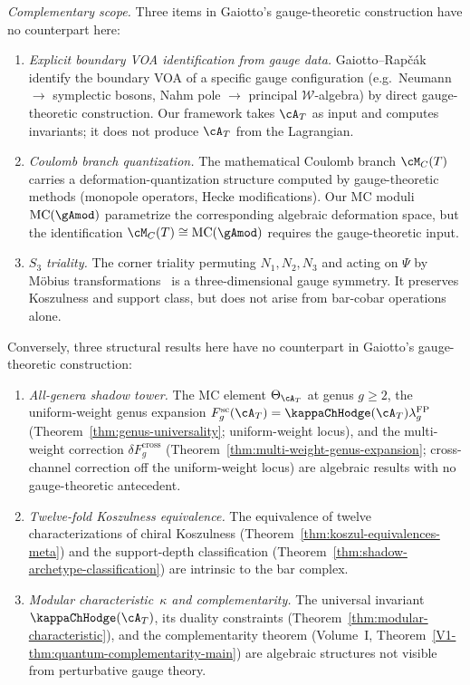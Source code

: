 \begin{remark}
\emph{Complementary scope.}
Three items in Gaiotto's gauge-theoretic construction have no
counterpart here:
\begin{enumerate}[label=\textup{(\alph*)}]
\item \emph{Explicit boundary VOA identification from gauge data.}
 Gaiotto--Rap\v{c}\'ak~\cite{gaiotto-rapchak} identify the
 boundary VOA of a specific gauge configuration (e.g.\
 Neumann $\to$ symplectic bosons,
 Nahm pole $\to$ principal $\mathcal{W}$-algebra) by
 direct gauge-theoretic construction. Our framework takes
 $\cA_T$ as input and computes invariants; it does not
 produce $\cA_T$ from the Lagrangian.

\item \emph{Coulomb branch quantization.}
 The mathematical Coulomb branch
 $\cM_C(T)$~\cite{BFN18} carries a
 deformation-quantization structure computed by gauge-theoretic
 methods (monopole operators, Hecke modifications). Our MC
 moduli $\operatorname{MC}(\gAmod)$ parametrize the
 corresponding algebraic deformation space, but the
 identification $\cM_C(T) \cong \operatorname{MC}(\gAmod)$
 requires the gauge-theoretic input.

\item \emph{$S_3$ triality.}
 The corner triality permuting $N_1, N_2, N_3$ and acting on
 $\Psi$ by M\"obius
 transformations~\cite{gaiotto-rapchak}
 is a three-dimensional gauge symmetry. It preserves
 Koszulness and support class, but does not arise from bar-cobar
 operations alone.
\end{enumerate}
Conversely, three structural results here have no counterpart
in Gaiotto's gauge-theoretic construction:
\begin{enumerate}[label=\textup{(\alph*)}]
\item \emph{All-genera shadow tower.}
 The MC element $\Theta_{\cA_T}$ at genus $g \geq 2$,
 the uniform-weight genus expansion
 $F_g^{\mathrm{sc}}(\cA_T)=\kappaChHodge(\cA_T)\lambda_g^{\mathrm{FP}}$
 (Theorem~\ref{thm:genus-universality};
 uniform-weight locus),
 and the multi-weight correction $\delta F_g^{\mathrm{cross}}$
 (Theorem~\ref{thm:multi-weight-genus-expansion};
 cross-channel correction off the uniform-weight locus) are
 algebraic results with no gauge-theoretic antecedent.

\item \emph{Twelve-fold Koszulness equivalence.}
 The equivalence of twelve characterizations of chiral
 Koszulness
 (Theorem~\ref{thm:koszul-equivalences-meta}) and the
 support-depth classification
 (Theorem~\ref{thm:shadow-archetype-classification}) are
 intrinsic to the bar complex.

\item \emph{Modular characteristic~$\kappa$ and complementarity.}
 The universal invariant~$\kappaChHodge(\cA_T)$, its duality
 constraints (Theorem~\ref{thm:modular-characteristic}),
 and the complementarity theorem
 (Volume~I, Theorem~\ref{V1-thm:quantum-complementarity-main}) are
 algebraic structures not visible from perturbative gauge
 theory.
\end{enumerate}
\end{remark}

